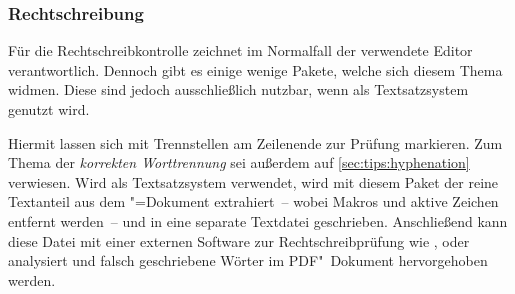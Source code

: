 \subsubsection{%
  Rechtschreibung%
}
%
Für die Rechtschreibkontrolle zeichnet im Normalfall der verwendete Editor 
verantwortlich. Dennoch gibt es einige wenige Pakete, welche sich diesem Thema 
widmen. Diese sind jedoch ausschließlich nutzbar, wenn als Textsatzsystem 
 genutzt wird.
\begin{DeclarePackages}
  Hiermit lassen sich mit  Trennstellen am Zeilenende zur 
  Prüfung markieren. Zum Thema der \textit{korrekten Worttrennung} sei außerdem 
  auf \autoref{sec:tips:hyphenation} verwiesen.
  Wird  als Textsatzsystem verwendet, wird mit diesem Paket 
  der reine Textanteil aus dem "=Dokument extrahiert~-- wobei 
  Makros und aktive Zeichen entfernt werden~-- und in eine separate Textdatei 
  geschrieben. Anschließend kann diese Datei mit einer externen Software zur  
  Rechtschreibprüfung wie ,  oder 
   analysiert und falsch geschriebene Wörter im 
  PDF"~Dokument hervorgehoben werden.
\end{DeclarePackages}
%



